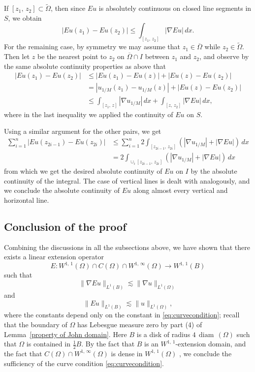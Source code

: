 \documentclass[reqno,11pt]{amsart}
\def\ch{{\mathcal H}}
\def\wz{\widetilde}
\def\ls{\lesssim}
\def\diam{{\mathop\mathrm{\,diam\,}}}
\numberwithin{equation}{section}
\theoremstyle{remark}
\begin{document}
If $[z_1,\,z_2] \subset \wz \Omega$, then since $Eu$ is absolutely continuous on
closed line segments in $S$, we obtain 
\[
|Eu(z_1)-Eu(z_2)|\le \int_{[z_1,\,z_2]} |\nabla Eu|\,dx. 
\]
For the remaining case, by symmetry we may assume that $z_1\in \overline{\Omega}$ while $z_2\in \wz \Omega$. 
Then let $z$ be the nearest point to $z_2$ on $\overline{\Omega}\cap I$ between $z_1$ and $z_2$, and 
observe by the same absolute continuity properties as above that
\begin{align*}
|Eu(z_1)-Eu(z_2)| & \le |Eu(z_1)-Eu(z)|+|Eu(z)-Eu(z_2)| \\
&= |u_{1/M}(z_1) - u_{1/M}(z)| + |Eu(z)-Eu(z_2)|\\
& \le \int_{[z_1,\,z]} |\nabla u_{1/M}|\,dx+\int_{[z,\,z_2]} |\nabla Eu|\, dx,
\end{align*}
where in the last inequality we applied the continuity of $Eu$ on $S$. 

Using a similar argument for the other pairs, we get
\begin{align*}
 \sum_{i=1}^{n} |Eu(z_{2i-1})-Eu(z_{2i})| & \le \sum_{i=1}^{n} 2 \int_{[z_{2i-1},\,z_{2i}]} (|\nabla u_{1/M}| + |\nabla Eu|)\, dx\\
 & = 2 \int_{\cup_i [z_{2i-1},\,z_{2i}]} (|\nabla u_{1/M}| + |\nabla Eu|)\, dx
\end{align*}
from which we get the desired absolute continuity of $Eu$ on $I$ by the absolute continuity of the integral. 
The case of vertical lines is dealt with analogously, 
 and we conclude the absolute continuity of $Eu$ along almost every vertical and 
horizontal line.

\subsection{Conclusion of the proof}

Combining the discussions in all the subsections above, we have shown that  there exists a linear extension operator 
$$E\colon W^{1,\,1}(\Omega)\cap C(\Omega)\cap W^{1,\,\infty}(\Omega) \to W^{1,\,1}(B)$$
such that 
$$\|\nabla Eu\|_{L^{1}(B)} \lesssim \|\nabla u\|_{L^{1}(\Omega)}$$
and
$$\| Eu\|_{L^{1}(B)}\ls \|u\|_{L^{1}(\Omega)},$$
where the constants depend only on the constant in \eqref{eq:curvecondition}; recall that the boundary of $\Omega$   has  Lebesgue measure zero by part (4) of Lemma~\ref{property of John domain}. 
Here $B$ is a disk of radius $4\diam(\Omega)$ such that  $\Omega$ is  contained in $\frac 1 2 B$. By the fact that $B$ is an $W^{1,\,1}$-extension domain, and the fact that  $C(\Omega)\cap W^{1,\,\infty}(\Omega)$ is dense in $W^{1,\,1}(\Omega)$ \cite{KZ2015}, we conclude the sufficiency of the curve condition \eqref{eq:curvecondition}. 
\end{document}
